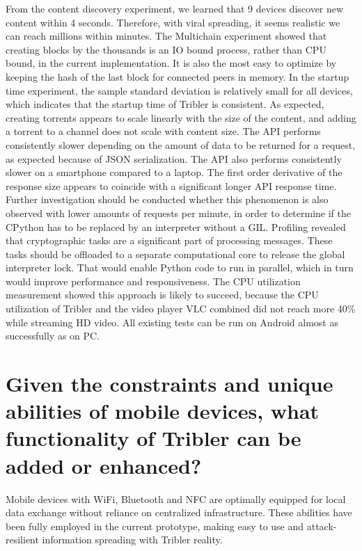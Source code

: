 From the content discovery experiment, we learned that 9 devices discover new content within 4 seconds.
Therefore, with viral spreading, it seems realistic we can reach millions within minutes.
The Multichain experiment showed that creating blocks by the thousands is an IO bound process, rather than CPU bound, in the current implementation.
It is also the most easy to optimize by keeping the hash of the last block for connected peers in memory.
In the startup time experiment, the sample standard deviation is relatively small for all devices, which indicates that the startup time of Tribler is consistent.
As expected, creating torrents appears to scale linearly with the size of the content, and adding a torrent to a channel does not scale with content size.
The API performs consistently slower depending on the amount of data to be returned for a request, as expected because of JSON serialization.
The API also performs consistently slower on a smartphone compared to a laptop.
The first order derivative of the response size appears to coincide with a significant longer API response time.
Further investigation should be conducted whether this phenomenon is also observed with lower amounts of requests per minute, in order to determine if the CPython has to be replaced by an interpreter without a GIL.
Profiling revealed that cryptographic tasks are a significant part of processing messages.
These tasks should be offloaded to a separate computational core to release the global interpreter lock.
That would enable Python code to run in parallel, which in turn would improve performance and responsiveness.
The CPU utilization measurement showed this approach is likely to succeed, because the CPU utilization of Tribler and the video player VLC combined did not reach more 40\% while streaming HD video.
All existing tests can be run on Android almost as successfully as on PC.







\section{Given the constraints and unique abilities of mobile devices, what functionality of Tribler can be added or enhanced?}
Mobile devices with WiFi, Bluetooth and NFC are optimally equipped for local data exchange without reliance on centralized infrastructure.
These abilities have been fully employed in the current prototype, making easy to use and attack-resilient information spreading with Tribler reality.

